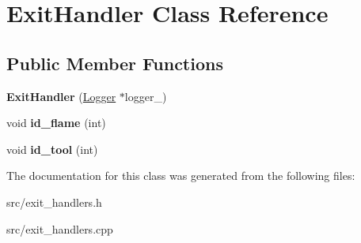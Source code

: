 \hypertarget{classExitHandler}{\section{Exit\-Handler Class Reference}
\label{classExitHandler}
}
\subsection*{Public Member Functions}
\begin{DoxyCompactItemize}
\item 
\hypertarget{classExitHandler_a5f0285c81ef992c1e7c0baebb3a1f91b}{{\bfseries Exit\-Handler} (\hyperlink{classLogger}{Logger} $\ast$logger\-\_\-)}\label{classExitHandler_a5f0285c81ef992c1e7c0baebb3a1f91b}

\item 
\hypertarget{classExitHandler_a315678b4d15101a2c934885e9174c51e}{void {\bfseries id\-\_\-flame} (int)}\label{classExitHandler_a315678b4d15101a2c934885e9174c51e}

\item 
\hypertarget{classExitHandler_a333723de1f5da55e04011362e57133f7}{void {\bfseries id\-\_\-tool} (int)}\label{classExitHandler_a333723de1f5da55e04011362e57133f7}

\end{DoxyCompactItemize}


The documentation for this class was generated from the following files\-:\begin{DoxyCompactItemize}
\item 
src/exit\-\_\-handlers.\-h\item 
src/exit\-\_\-handlers.\-cpp\end{DoxyCompactItemize}
